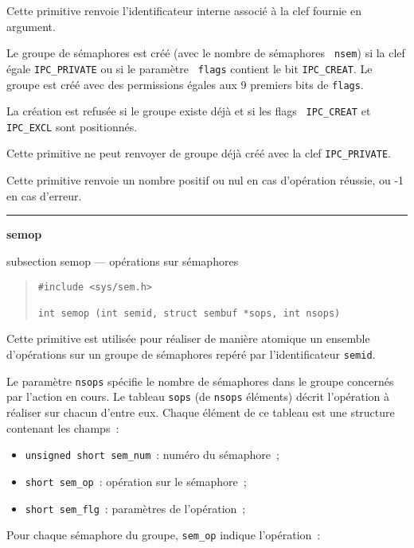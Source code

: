 \documentclass [twoside] {report}
\newcommand {\primitive} [1]
    {
	{\large \bf #1}
	\addcontentsline {toc} {subsection} {#1}
    }
\newcommand {\separation}
    {
	\vspace {7mm}
	\nopagebreak
	\hrule
    }
\begin{document}
Cette primitive renvoie l'identificateur interne associé à la clef
fournie en argument.

Le groupe de sémaphores est créé (avec le nombre de sémaphores {\tt
nsem}) si la clef égale {\tt IPC\_PRIVATE} ou si le paramètre {\tt
flags} contient le bit {\tt IPC\_CREAT}.  Le groupe est créé avec des
permissions égales aux 9 premiers bits de {\tt flags}.

La création est refusée si le groupe existe déjà et si les flags {\tt
IPC\_CREAT} et {\tt IPC\_EXCL} sont positionnés.

Cette primitive ne peut renvoyer de groupe déjà créé avec la clef
{\tt IPC\_PRIVATE}.

Cette primitive renvoie un nombre positif ou nul en cas d'opération
réussie, ou -1 en cas d'erreur.


\separation
\primitive {semop} --- opérations sur sémaphores

\begin {quote}
\begin {verbatim}
#include <sys/sem.h>

int semop (int semid, struct sembuf *sops, int nsops)
\end{verbatim}
\end {quote}

Cette primitive est utilisée pour réaliser de manière atomique un
ensemble d'opérations sur un groupe de sémaphores repéré par
l'identificateur {\tt semid}.

Le paramètre {\tt nsops} spécifie le nombre de sémaphores dans le groupe
concernés par l'action en cours.  Le tableau {\tt sops} (de {\tt nsops}
éléments) décrit l'opération à réaliser sur chacun d'entre eux.  Chaque
élément de ce tableau est une structure contenant les champs~:

\begin {itemize}
    \item {\tt unsigned short sem\_num}~: numéro du sémaphore~;
    \item {\tt short sem\_op}~: opération sur le sémaphore~;
    \item {\tt short sem\_flg}~: paramètres de l'opération~;
\end {itemize}

Pour chaque sémaphore du groupe, {\tt sem\_op} indique l'opération~:
\end{document}
